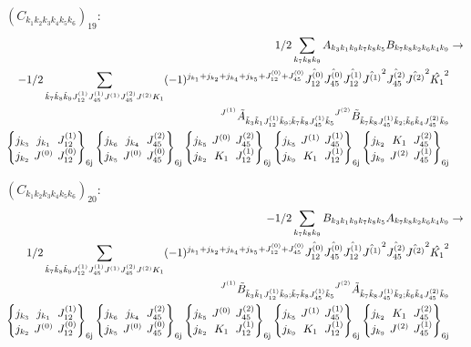 \documentclass[11pt]{article}
\newcommand{\sixj}[6]{\begingroup\setlength{\arraycolsep}{0.2em}\begin{Bmatrix} #1 & #2 & #3 \\ #4 & #5 & #6 \end{Bmatrix}_{\text{6j}}\endgroup}
\begin{document}
$\left({C}_{{k}_{1}{k}_{2}{k}_{3}{k}_{4}{k}_{5}{k}_{6}}\right)_{19}$:
\begin{align}
1/2\sum_{{k}_{7}{k}_{8}{k}_{9}}{A}_{{k}_{3}{k}_{1}{k}_{9}{k}_{7}{k}_{8}{k}_{5}}{B}_{{k}_{7}{k}_{8}{k}_{2}{k}_{6}{k}_{4}{k}_{9}}&\rightarrow \notag \\-1/2\sum_{\tilde{k}_{7}\tilde{k}_{8}\tilde{k}_{9}J^{(1)}_{12}J^{(1)}_{45}J^{(1)}J^{(2)}_{45}J^{(2)}K_{1}}(-1)^{j_{{k}_{1}} +j_{{k}_{2}} +j_{{k}_{4}} +j_{{k}_{5}} +J^{(0)}_{12} +J^{(0)}_{45} }\hat{J^{(0)}_{12}}\hat{J^{(0)}_{45}}\hat{J^{(1)}_{12}}\hat{J^{(1)}}^{2}\hat{J^{(2)}_{45}}\hat{J^{(2)}}^{2}\hat{K_{1}}^{2}& \notag \\{}^{J^{(1)}}\tilde{A}_{\tilde{k}_{3}\tilde{k}_{1}J^{(1)}_{12}\tilde{k}_{9};\tilde{k}_{7}\tilde{k}_{8}J^{(1)}_{45}\tilde{k}_{5}}{}^{J^{(2)}}\tilde{B}_{\tilde{k}_{7}\tilde{k}_{8}J^{(1)}_{45}\tilde{k}_{2};\tilde{k}_{6}\tilde{k}_{4}J^{(2)}_{45}\tilde{k}_{9}}& \notag \\\sixj{j_{{k}_{3}}}{j_{{k}_{1}}}{J^{(1)}_{12}}{j_{{k}_{2}}}{J^{(0)}}{J^{(0)}_{12}}\sixj{j_{{k}_{6}}}{j_{{k}_{4}}}{J^{(2)}_{45}}{j_{{k}_{5}}}{J^{(0)}}{J^{(0)}_{45}}\sixj{j_{{k}_{5}}}{J^{(0)}}{J^{(2)}_{45}}{j_{{k}_{2}}}{K_{1}}{J^{(1)}_{12}}\sixj{j_{{k}_{5}}}{J^{(1)}}{J^{(1)}_{45}}{j_{{k}_{9}}}{K_{1}}{J^{(1)}_{12}}\sixj{j_{{k}_{2}}}{K_{1}}{J^{(2)}_{45}}{j_{{k}_{9}}}{J^{(2)}}{J^{(1)}_{45}}
\end{align}

$\left({C}_{{k}_{1}{k}_{2}{k}_{3}{k}_{4}{k}_{5}{k}_{6}}\right)_{20}$:
\begin{align}
-1/2\sum_{{k}_{7}{k}_{8}{k}_{9}}{B}_{{k}_{3}{k}_{1}{k}_{9}{k}_{7}{k}_{8}{k}_{5}}{A}_{{k}_{7}{k}_{8}{k}_{2}{k}_{6}{k}_{4}{k}_{9}}&\rightarrow \notag \\1/2\sum_{\tilde{k}_{7}\tilde{k}_{8}\tilde{k}_{9}J^{(1)}_{12}J^{(1)}_{45}J^{(1)}J^{(2)}_{45}J^{(2)}K_{1}}(-1)^{j_{{k}_{1}} +j_{{k}_{2}} +j_{{k}_{4}} +j_{{k}_{5}} +J^{(0)}_{12} +J^{(0)}_{45} }\hat{J^{(0)}_{12}}\hat{J^{(0)}_{45}}\hat{J^{(1)}_{12}}\hat{J^{(1)}}^{2}\hat{J^{(2)}_{45}}\hat{J^{(2)}}^{2}\hat{K_{1}}^{2}& \notag \\{}^{J^{(1)}}\tilde{B}_{\tilde{k}_{3}\tilde{k}_{1}J^{(1)}_{12}\tilde{k}_{9};\tilde{k}_{7}\tilde{k}_{8}J^{(1)}_{45}\tilde{k}_{5}}{}^{J^{(2)}}\tilde{A}_{\tilde{k}_{7}\tilde{k}_{8}J^{(1)}_{45}\tilde{k}_{2};\tilde{k}_{6}\tilde{k}_{4}J^{(2)}_{45}\tilde{k}_{9}}& \notag \\\sixj{j_{{k}_{3}}}{j_{{k}_{1}}}{J^{(1)}_{12}}{j_{{k}_{2}}}{J^{(0)}}{J^{(0)}_{12}}\sixj{j_{{k}_{6}}}{j_{{k}_{4}}}{J^{(2)}_{45}}{j_{{k}_{5}}}{J^{(0)}}{J^{(0)}_{45}}\sixj{j_{{k}_{5}}}{J^{(0)}}{J^{(2)}_{45}}{j_{{k}_{2}}}{K_{1}}{J^{(1)}_{12}}\sixj{j_{{k}_{5}}}{J^{(1)}}{J^{(1)}_{45}}{j_{{k}_{9}}}{K_{1}}{J^{(1)}_{12}}\sixj{j_{{k}_{2}}}{K_{1}}{J^{(2)}_{45}}{j_{{k}_{9}}}{J^{(2)}}{J^{(1)}_{45}}
\end{align}
\end{document}
